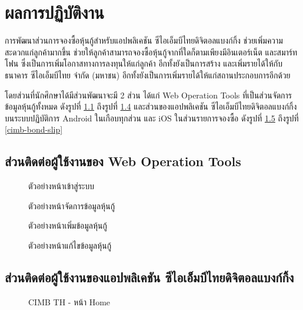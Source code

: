 \chapter{ผลการปฏิบัติงาน}
\thispagestyle{empty}
\label{chapter:result}

การพัฒนาส่วนการจองซื้อหุ้นกู้สำหรับแอปพลิเคชัน ซีไอเอ็มบีไทยดิจิตอลแบงก์กิ้ง ช่วยเพิ่มความสะดวกแก่ลูกค้ามากขึ้น ช่วยให้ลูกค้าสามารถจองซื้อหุ้นกู้จากที่ใดก็ตามเพียงมีอินเตอร์เน็ต และสมาร์ทโฟน
ซึ่งเป็นการเพิ่มโอกาสทางการลงทุนให้แก่ลูกค้า อีกทั้งยังเป็นการสร้าง และเพิ่มรายได้ให้กับธนาคาร ซีไอเอ็มบีไทย จำกัด (มหาชน) อีกทั้งยังเป็นการเพิ่มรายได้ให้แก่สถานประกอบการอีกด้วย

โดยส่วนที่นักศึกษาได้มีส่วนพัฒนาจะมี 2 ส่วน ได้แก่ Web Operation Tools ที่เป็นส่วนจัดการข้อมูลหุ้นกู้ทั้งหมด ดังรูปที่ \ref{web-oper-1} ถึงรูปที่ \ref{web-oper-4} 
และส่วนของแอปพลิเคชัน ซีไอเอ็มบีไทยดิจิตอลแบงก์กิ้ง บนระบบปฏิบัติการ Android ในเกือบทุกส่วน
และ iOS ในส่วนรายการจองซื้อ ดังรูปที่ \ref{cimb-home} ถึงรูปที่ \ref{cimb-bond-slip}
\section{ส่วนติดต่อผู้ใช้งานของ Web Operation Tools}
\begin{figure}[H]
	\centering
	\caption{ตัวอย่างหน้าเข้าสู่ระบบ}
	\label{web-oper-1}
\end{figure}

\begin{figure}[H]
	\centering
	\caption{ตัวอย่างหน้าจัดการข้อมูลหุ้นกู้}
	\label{web-oper-2}
\end{figure}

\begin{figure}[H]
	\centering
	\caption{ตัวอย่างหน้าเพิ่มข้อมูลหุ้นกู้}
	\label{web-oper-3}
\end{figure}

\begin{figure}[H]
	\centering
	\caption{ตัวอย่างหน้าแก้ไขข้อมูลหุ้นกู้}
	\label{web-oper-4}
\end{figure}

\section{ส่วนติดต่อผู้ใช้งานของแอปพลิเคชัน ซีไอเอ็มบีไทยดิจิตอลแบงก์กิ้ง}
\begin{figure}[H]
	\centering
	\caption{CIMB TH - หน้า Home}\label{cimb-home}
\end{figure}


